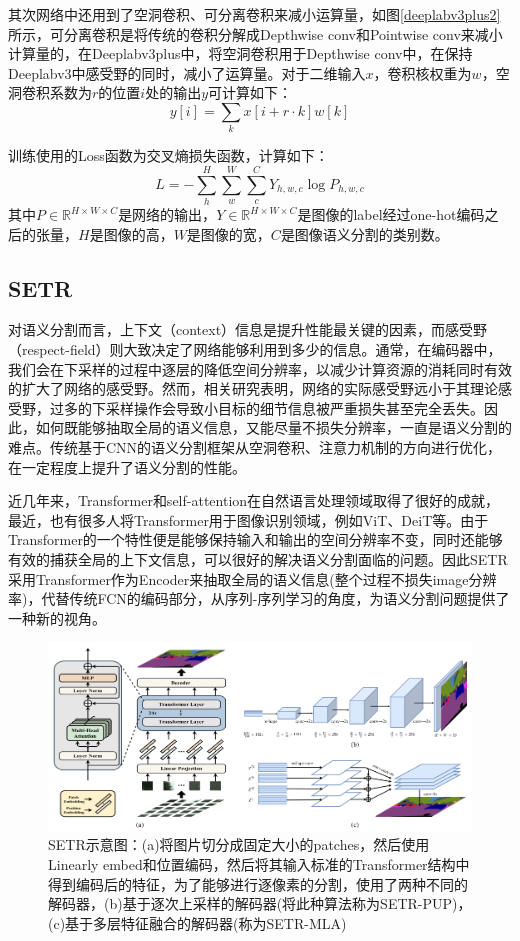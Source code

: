 \documentclass[cn,12pt,color=mine,scheme=chinese,bibstyle=gb7714-2015]{elegantbook}
\begin{document}
其次网络中还用到了空洞卷积、可分离卷积来减小运算量，如图\ref{deeplabv3plus2}所示，可分离卷积是将传统的卷积分解成Depthwise conv和Pointwise conv来减小计算量的，在Deeplabv3plus中，将空洞卷积用于Depthwise conv中，在保持Deeplabv3中感受野的同时，减小了运算量。对于二维输入$x$，卷积核权重为$w$，空洞卷积系数为$r$的位置$i$处的输出$y$可计算如下：
\begin{equation}
	y[i]=\sum_k x[i+r\cdot k]w[k]
\end{equation}

训练使用的Loss函数为交叉熵损失函数，计算如下：
\begin{equation}
	\label{ce}
	L=-\sum_h^H\sum_w^W\sum_c^CY_{h,w,c}\log P_{h,w,c}
\end{equation}
其中$P\in\mathbb{R}^{H\times W\times C}$是网络的输出，$Y\in\mathbb{R}^{H\times W\times C}$是图像的label经过one-hot编码之后的张量，$H$是图像的高，$W$是图像的宽，$C$是图像语义分割的类别数。

\subsection{SETR}
对语义分割而言，上下文（context）信息是提升性能最关键的因素，而感受野（respect-field）则大致决定了网络能够利用到多少的信息。通常，在编码器中，我们会在下采样的过程中逐层的降低空间分辨率，以减少计算资源的消耗同时有效的扩大了网络的感受野。然而，相关研究表明，网络的实际感受野远小于其理论感受野，过多的下采样操作会导致小目标的细节信息被严重损失甚至完全丢失。因此，如何既能够抽取全局的语义信息，又能尽量不损失分辨率，一直是语义分割的难点。传统基于CNN的语义分割框架从空洞卷积、注意力机制的方向进行优化，在一定程度上提升了语义分割的性能。

近几年来，Transformer\cite{vaswani2017attention}和self-attention在自然语言处理领域取得了很好的成就，最近，也有很多人将Transformer用于图像识别领域，例如ViT\cite{dosovitskiy2021image}、DeiT\cite{touvron2020deit}等。由于Transformer的一个特性便是能够保持输入和输出的空间分辨率不变，同时还能够有效的捕获全局的上下文信息，可以很好的解决语义分割面临的问题。因此SETR采用Transformer作为Encoder来抽取全局的语义信息(整个过程不损失image分辨率)，代替传统FCN的编码部分，从序列-序列学习的角度，为语义分割问题提供了一种新的视角。

\begin{figure}[h]
	\centering
	\includegraphics[width=.9\linewidth]{images/setr1}
	\caption{SETR示意图：(a)将图片切分成固定大小的patches，然后使用Linearly embed和位置编码，然后将其输入标准的Transformer结构中得到编码后的特征，为了能够进行逐像素的分割，使用了两种不同的解码器，(b)基于逐次上采样的解码器(将此种算法称为SETR-PUP)，(c)基于多层特征融合的解码器(称为SETR-MLA)}
	\label{setr}
\end{figure}
\end{document}
